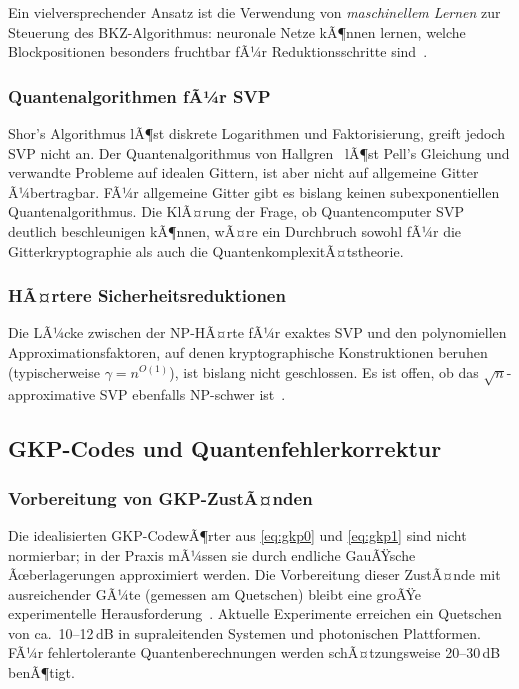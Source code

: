﻿\documentclass[a4paper,12pt]{article}
\theoremstyle{definition}
\begin{document}
Ein vielversprechender Ansatz ist die Verwendung von \emph{maschinellem Lernen}
zur Steuerung des BKZ-Algorithmus: neuronale Netze kÃ¶nnen lernen, welche
Blockpositionen besonders fruchtbar fÃ¼r Reduktionsschritte sind~\cite{Novaes2023}.

\subsubsection{Quantenalgorithmen fÃ¼r SVP}

Shor's Algorithmus lÃ¶st diskrete Logarithmen und Faktorisierung,
greift jedoch SVP nicht an.
Der Quantenalgorithmus von Hallgren~\cite{Hallgren2007} lÃ¶st Pell's Gleichung
und verwandte Probleme auf idealen Gittern, ist aber nicht auf allgemeine Gitter Ã¼bertragbar.
FÃ¼r allgemeine Gitter gibt es bislang keinen subexponentiellen Quantenalgorithmus.
Die KlÃ¤rung der Frage, ob Quantencomputer SVP deutlich beschleunigen kÃ¶nnen,
wÃ¤re ein Durchbruch sowohl fÃ¼r die Gitterkryptographie als auch die QuantenkomplexitÃ¤tstheorie.

\subsubsection{HÃ¤rtere Sicherheitsreduktionen}

Die LÃ¼cke zwischen der NP-HÃ¤rte fÃ¼r exaktes SVP und den polynomiellen Approximationsfaktoren,
auf denen kryptographische Konstruktionen beruhen (typischerweise $\gamma = n^{O(1)}$),
ist bislang nicht geschlossen.
Es ist offen, ob das $\sqrt{n}$-approximative SVP ebenfalls NP-schwer ist~\cite{Khot2005}.

\subsection{GKP-Codes und Quantenfehlerkorrektur}

\subsubsection{Vorbereitung von GKP-ZustÃ¤nden}

Die idealisierten GKP-CodewÃ¶rter aus \eqref{eq:gkp0} und \eqref{eq:gkp1}
sind nicht normierbar; in der Praxis mÃ¼ssen sie durch endliche
GauÃŸsche Ãœberlagerungen approximiert werden.
Die Vorbereitung dieser ZustÃ¤nde mit ausreichender GÃ¼te
(gemessen am Quetschen) bleibt eine groÃŸe experimentelle Herausforderung~\cite{Campagne2020}.
Aktuelle Experimente erreichen ein Quetschen von ca.~10--12\,dB in supraleitenden
Systemen und photonischen Plattformen.
FÃ¼r fehlertolerante Quantenberechnungen werden schÃ¤tzungsweise 20--30\,dB benÃ¶tigt.
\end{document}
